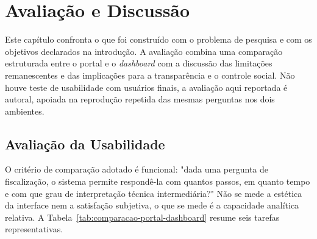 \chapter{Avaliação e Discussão}
\label{cap:avaliacao}

Este capítulo confronta o que foi construído com o problema de pesquisa e com os objetivos declarados na introdução. A avaliação combina uma comparação estruturada entre o portal e o \textit{dashboard} com a discussão das limitações remanescentes e das implicações para a transparência e o controle social. Não houve teste de usabilidade com usuários finais, a avaliação aqui reportada é autoral, apoiada na reprodução repetida das mesmas perguntas nos dois ambientes.

\section{Avaliação da Usabilidade}

O critério de comparação adotado é funcional: "dada uma pergunta de fiscalização, o sistema permite respondê-la com quantos passos, em quanto tempo e com que grau de interpretação técnica intermediária?" Não se mede a estética da interface nem a satisfação subjetiva, o que se mede é a capacidade analítica relativa. A Tabela~\ref{tab:comparacao-portal-dashboard} resume seis tarefas representativas.

